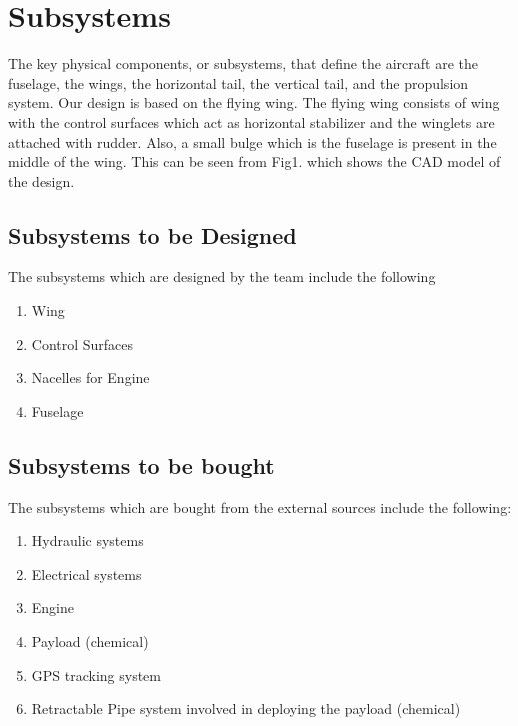 \chapter{Subsystems}
The key physical components, or subsystems, that define the aircraft are the fuselage,
the wings, the horizontal tail, the vertical tail, and the propulsion system. Our design is based
on the flying wing. The flying wing consists of wing with the control surfaces which act as
horizontal stabilizer and the winglets are attached with rudder. Also, a small bulge which is
the fuselage is present in the middle of the wing. This can be seen from Fig1. which shows
the CAD model of the design.
\section{Subsystems to be Designed}
The subsystems which are designed by the team include the following
\begin{enumerate}
\item Wing 
\item Control Surfaces
\item Nacelles for Engine
\item Fuselage
\end{enumerate}
\section{Subsystems to be bought}
The subsystems which are bought from the external sources include the following:
\begin{enumerate}
\item Hydraulic systems
\item Electrical systems
\item Engine
\item Payload (chemical)
\item GPS tracking system
\item Retractable Pipe system involved in deploying the payload (chemical)
\end{enumerate}
